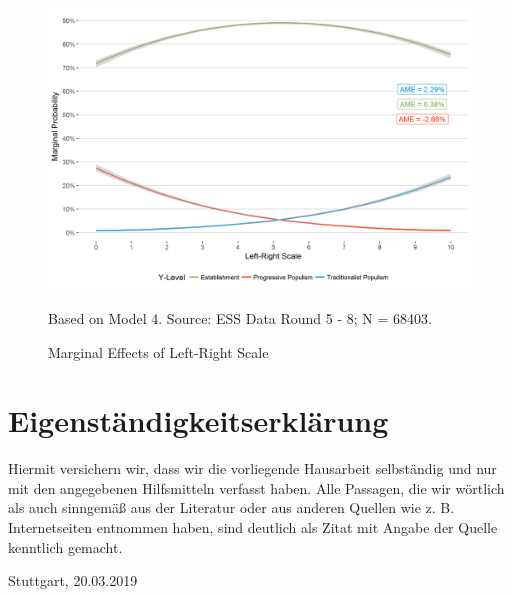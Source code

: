 \begin{figure}[!h]
	\caption{Marginal Effects of Left-Right Scale}
	\label{lrscale_probs}
	\includegraphics[width=\textwidth]{images/lrscale_probs.png}
	\flushright
	{\scriptsize Based on Model 4. Source: ESS Data Round 5 - 8; N = 68403. \par}
\end{figure}





\clearpage
\section*{Eigenständigkeitserklärung}
\vspace*{2cm}
\begin{center}
	\begin{minipage}[t]{0.8\textwidth}
		Hiermit versichern wir, dass wir die vorliegende Hausarbeit selbständig und nur mit den angegebenen Hilfsmitteln verfasst haben. Alle Passagen, die wir wörtlich als auch sinngemäß aus der Literatur oder aus anderen Quellen wie z. B. Internetseiten entnommen haben, sind deutlich als Zitat mit Angabe der Quelle kenntlich gemacht.
		
		\vspace*{60mm}
		Stuttgart, 20.03.2019
	\end{minipage}
\end{center}




